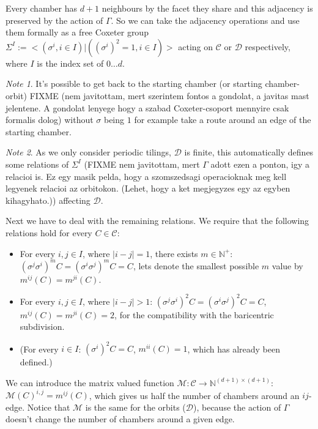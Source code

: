 \documentclass[12pt,a4paper]{article}
\theoremstyle{plain}%
\theoremstyle{definition}
\theoremstyle{remark}
\newtheorem*{note}{Note}
\begin{document}
Every chamber has $d+1$ neighbours by the facet they share and this adjacency is
preserved by the action of $\Gamma$. So we can take the adjacency operations and
use them formally as a free Coxeter group $\Sigma^I := <(\sigma^i, i\in I) |
((\sigma^i)^2=1, i\in I)>$ acting on $\mathcal{C}$ or $\mathcal{D}$
respectively, where $I$ is the index set of $0\ldots d$. 

\begin{note}
  It's possible to
get back to the starting chamber (or starting chamber-orbit) FIXME (nem
javitottam, mert szerintem fontos a gondolat, a javitas mast jelentene. A
gondolat lenyege hogy a szabad Coxeter-csoport mennyire csak formalis dolog) without $\sigma$
being $1$ for example take a route around an edge of the starting chamber. 
\end{note}

\begin{note}
As we only consider periodic tilings, $\mathcal{D}$ is finite, this
automatically defines some relations of $\Sigma^I$ (FIXME nem javitottam, mert
$\Gamma$ adott ezen a ponton, igy a relacioi is. Ez egy masik pelda, hogy a
szomszedsagi operacioknak meg kell legyenek relacioi az orbitokon. (Lehet, hogy
a ket megjegyzes egy az egyben kihagyhato.)) affecting $\mathcal{D}$.
\end{note}

Next we have to deal with the remaining relations. We require that the following
relations hold for every $C\in\mathcal{C}$:
\begin{itemize}
  \item For every $i,j\in I$, where $|i-j|=1$, there exists
    $m\in\mathbb{N}^+$:
    $(\sigma^j\sigma^i)^mC=(\sigma^i\sigma^j)^mC=C$, lets denote the smallest
    possible $m$ value by $m^{ij}(C)=m^{ji}(C)$.
  \item For every $i,j\in I$, where $|i-j|>1$:
    $(\sigma^j\sigma^i)^2C=(\sigma^i\sigma^j)^2C=C$, $m^{ij}(C)=m^{ji}(C)=2$,
    for the compatibility with the baricentric subdivision.  
  \item (For every $i\in I$: $(\sigma^i)^2C=C$, $m^{ii}(C)=1$, which has already
    been defined.)
\end{itemize}

We can introduce the matrix valued function $\mathcal{M}: \mathcal{C}
\rightarrow \mathbb{N}^{(d+1)\times (d+1)}$: $\mathcal{M}(C)^{i,j}=m^{ij}(C)$, which
gives us half the number of chambers around an $ij$-edge. Notice that $\mathcal{M}$
is the same for the orbits ($\mathcal{D}$), because the action of $\Gamma$
doesn't change the number of chambers around a given edge.
\end{document}
